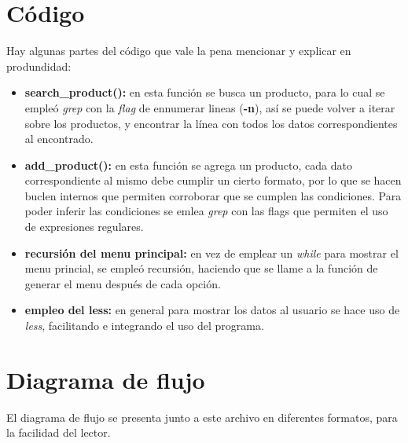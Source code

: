 \documentclass[letterpaper, 10 pt, conference]{ieeeconf}  %
\begin{document}
\section{Código}
Hay algunas partes del código que vale la pena mencionar y explicar en produndidad:
\begin{itemize}
  \item \textbf{search\_product():} en esta función se busca un producto, para lo cual se empleó \textit{grep} con la \textit{flag} de ennumerar lineas (\textbf{-n}), así se puede volver a iterar sobre los productos, y encontrar la línea con todos los datos correspondientes al encontrado.
  \item \textbf{add\_product():} en esta función se agrega un producto, cada dato correspondiente al mismo debe cumplir un cierto formato, por lo que se hacen buclen internos que permiten corroborar que se cumplen las condiciones. Para poder inferir las condiciones se emlea \textit{grep} con las flags que permiten el uso de expresiones regulares.
  \item \textbf{recursión del menu principal:} en vez de emplear un \textit{while} para mostrar el menu princial, se empleó recursión, haciendo que se llame a la función de generar el menu después de cada opción.
  \item \textbf{empleo del less:} en general para mostrar los datos al usuario se hace uso de \textit{less}, facilitando e integrando el uso del programa. 
\end{itemize}

\section{Diagrama de flujo}
El diagrama de flujo se presenta junto a este archivo en diferentes formatos, para la facilidad del lector.
\end{document}
